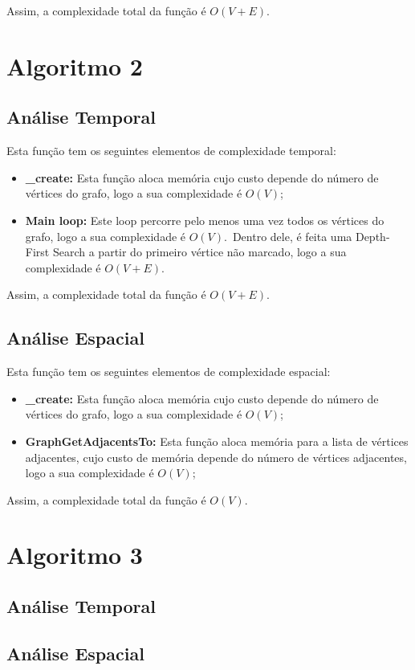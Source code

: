 Assim, a complexidade total da função é $O(V + E)$.

\pagebreak

\section{Algoritmo 2}
\label{sec:analise-formal:algoritmo-2}

\subsection{Análise Temporal}
\label{sec:analise-formal:algoritmo-2:analise-temporal}

Esta função tem os seguintes elementos de complexidade temporal:

\begin{itemize}
    \item \textbf{\_create:} Esta função aloca memória cujo custo depende do número de vértices do grafo, logo a sua complexidade é $O(V)$;
    \item \textbf{Main loop:} Este loop percorre pelo menos uma vez todos os vértices do grafo, logo a sua complexidade é $O(V)$.\ Dentro dele, é feita uma Depth-First Search a partir do primeiro vértice não marcado, logo a sua complexidade é $O(V + E)$.
\end{itemize}

Assim, a complexidade total da função é $O(V + E)$.

\subsection{Análise Espacial}
\label{sec:analise-formal:algoritmo-2:analise-espacial}

Esta função tem os seguintes elementos de complexidade espacial:

\begin{itemize}
    \item \textbf{\_create:} Esta função aloca memória cujo custo depende do número de vértices do grafo, logo a sua complexidade é $O(V)$;
    \item \textbf{GraphGetAdjacentsTo:} Esta função aloca memória para a lista de vértices adjacentes, cujo custo de memória depende do número de vértices adjacentes, logo a sua complexidade é $O(V)$;
\end{itemize}

Assim, a complexidade total da função é $O(V)$.

\section{Algoritmo 3}
\label{sec:analise-formal:algoritmo-3}

\subsection{Análise Temporal}
\label{sec:analise-formal:algoritmo-3:analise-temporal}

\subsection{Análise Espacial}
\label{sec:analise-formal:algoritmo-3:analise-espacial}